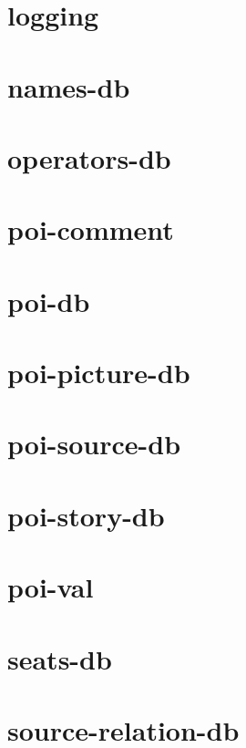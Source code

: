 \section{logging}

\newpage
\section{names-db}

\newpage
\section{operators-db}

\newpage
\section{poi-comment}

\newpage
\section{poi-db}

\newpage
\section{poi-picture-db}

\newpage
\section{poi-source-db}

\newpage
\section{poi-story-db}

\newpage
\section{poi-val}

\newpage
\section{seats-db}

\newpage
\section{source-relation-db}

\newpage
